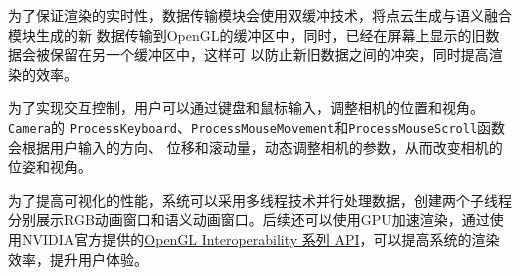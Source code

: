 \par 为了保证渲染的实时性，数据传输模块会使用双缓冲技术，将点云生成与语义融合模块生成的新
数据传输到OpenGL的缓冲区中，同时，已经在屏幕上显示的旧数据会被保留在另一个缓冲区中，这样可
以防止新旧数据之间的冲突，同时提高渲染的效率。

\par 为了实现交互控制，用户可以通过键盘和鼠标输入，调整相机的位置和视角。\texttt{Camera}的
\texttt{ProcessKeyboard}、\texttt{ProcessMouseMovement}和\texttt{ProcessMouseScroll}函数会根据用户输入的方向、
位移和滚动量，动态调整相机的参数，从而改变相机的位姿和视角。

\par 为了提高可视化的性能，系统可以采用多线程技术并行处理数据，创建两个子线程分别展示RGB动画窗口和语义动画窗口。后续还可以使用GPU加速渲染，通过使用NVIDIA官方提供的\href{https://docs.nvidia.com/cuda/cuda-runtime-api/group__CUDART__OPENGL.html#group__CUDART__OPENGL}{OpenGL Interoperability 系列 API}，可以提高系统的渲染效率，提升用户体验。